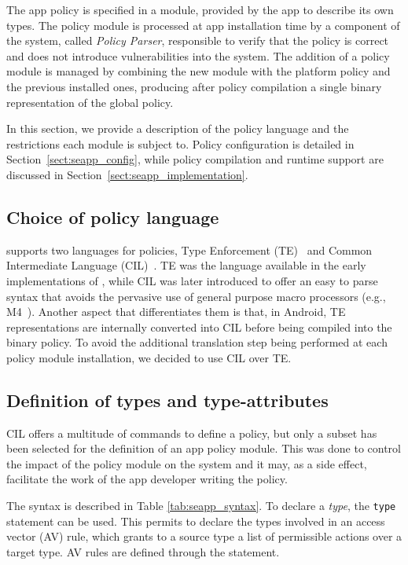 The app policy is specified in a module, provided by the app to
describe its own types.  The policy module is processed at app
installation time by a component of the system, called {\em \pap
  Policy Parser}, responsible to verify that the policy is correct and
does not introduce vulnerabilities into the system.  The addition of a
policy module is managed by combining the new module with the platform
policy and the previous installed ones, producing after policy
compilation a single binary representation of the global policy.

In this section, we provide a description of the \pap policy language
and the restrictions each module is subject to.  Policy configuration
is detailed in Section~\ref{sect:seapp_config}, while policy
compilation and runtime support are discussed in
Section~\ref{sect:seapp_implementation}.

\subsection{Choice of policy language}\label{seapp_lang}

\sea supports two languages for policies, Type Enforcement
(TE)~\cite{seapp_libte_rules} and Common Intermediate Language
(CIL)~\cite{seapp_cil}.  TE was the language available in the early
implementations of \sel, while CIL was later introduced to offer an
easy to parse syntax that avoids the pervasive use of general purpose
macro processors (e.g., M4~\cite{seapp_m4}).  Another aspect that
differentiates them is that, in Android, TE representations are
internally converted into CIL before being compiled into the \sel
binary policy.  To avoid the additional translation step being
performed at each policy module installation, we decided to use CIL
over TE.

\subsection{Definition of types and type-attributes}

CIL offers a multitude of commands to define a policy, but only a
subset has been selected for the definition of an app policy module.
This was done to control the impact of the policy module on the system
and it may, as a side effect, facilitate the work of the app developer
writing the policy.

The syntax is described in Table \ref{tab:seapp_syntax}.  To declare a
\emph{type}, the \texttt{type} statement can be used.  This permits to
declare the types involved in an access vector (AV) rule, which grants
to a source type a list of permissible actions over a target type.  AV
rules are defined through the \allow statement.

